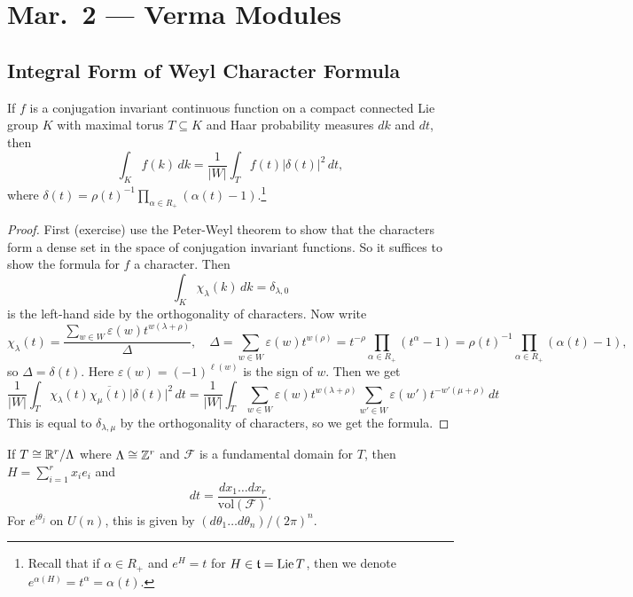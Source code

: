 \chapter{Mar.~2 --- Verma Modules}

\section{Integral Form of Weyl Character Formula}

\begin{theorem}
  If $f$ is a conjugation invariant
  continuous function on a compact connected
  Lie group $K$ with maximal torus
  $T \subseteq K$ and Haar probability
  measures $dk$ and $dt$, then
  \[
    \int_K f(k)\, dk
    = \frac{1}{|W|} \int_T f(t) |\delta(t)|^2\, dt,
  \] 
  where
  $\delta(t) = \rho(t)^{-1} \prod_{\alpha \in R_+} (\alpha(t) - 1)$.\footnote{Recall that if $\alpha \in R_+$ and $e^H = t$ for $H \in \mathfrak{t} = \operatorname{Lie} T$, then we denote $e^{\alpha(H)} = t^\alpha = \alpha(t)$.}
\end{theorem}

\begin{proof}
  First (exercise) use
  the Peter-Weyl theorem to show that the
  characters form a dense set in the
  space of conjugation invariant functions.
  So it suffices to show the formula for $f$
  a character. Then
  \[
    \int_K \chi_\lambda(k)\, dk
    = \delta_{\lambda, 0}
  \]
  is the left-hand side
  by the orthogonality of characters.
  Now write
  \[
    \chi_\lambda(t)
    = \frac{\sum_{w \in W} \varepsilon(w) t^{w(\lambda + \rho)}}{\Delta}, \quad
    \Delta = \sum_{w \in W} \varepsilon(w) t^{w(\rho)} = t^{-\rho} \prod_{\alpha \in R_+} (t^\alpha - 1)
    = \rho(t)^{-1} \prod_{\alpha \in R_+} (\alpha(t) - 1),
  \]
  so $\Delta = \delta(t)$.
  Here $\varepsilon(w) = (-1)^{\ell(w)}$
  is the sign of $w$.
  Then we get
  \[
    \frac{1}{|W|} \int_T \chi_\lambda(t)
    \overline{\chi_\mu(t)} |\delta(t)|^2\, dt
    = \frac{1}{|W|}  \int_T
    \sum_{w \in W} \varepsilon(w) t^{w(\lambda + \rho)}
    \sum_{w' \in W} \varepsilon(w') t^{-w'(\mu + \rho)}\, dt
  \]
  This is equal to $\delta_{\lambda, \mu}$
  by the orthogonality of characters, so
  we get the formula.
\end{proof}

\begin{remark}
  If $T \cong \mathbb{R}^r / \Lambda$ where
  $\Lambda \cong \mathbb{Z}^r$ and
  $\mathcal{F}$ is a fundamental domain for
  $T$, then $H = \sum_{i = 1}^r x_i e_i$
  and
  \[
    dt = \frac{dx_1 \ldots dx_r}{\mathrm{vol}(\mathcal{F})}.
  \]
  For $e^{i\theta_j}$ on $U(n)$, this is
  given by $(d\theta_1 \ldots d\theta_n) / (2\pi)^n$.
\end{remark}

